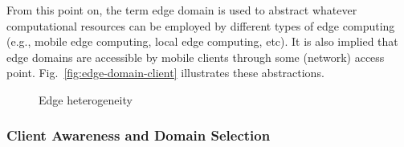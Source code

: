 From this point on, the term edge domain is used to abstract whatever computational resources can be employed by different types of edge computing (e.g., mobile edge computing, local edge computing, etc). It is also implied that edge domains are accessible by mobile clients through some (network) access point. Fig.~\ref{fig:edge-domain-client} illustrates these abstractions. 

\begin{figure}[tbp]
	\centering
	\captionsetup[subfigure]{width=0.5\textwidth}	
	\null\hfill
	\captionsetup[subfigure]{width=0.45\textwidth}	
	\hfill
	\hfill\null
	\caption{Edge heterogeneity}\label{fig:1}
\end{figure}


\subsubsection{Client Awareness and Domain Selection}

